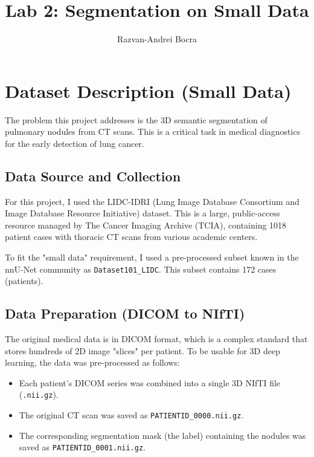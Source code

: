 \documentclass[11pt, a4paper]{article}
\title{Lab 2: Segmentation on Small Data}
\author{Razvan-Andrei Bocra}
\begin{document}
\maketitle

\section{Dataset Description (Small Data)}

The problem this project addresses is the 3D semantic segmentation of pulmonary nodules from CT scans. This is a critical task in medical diagnostics for the early detection of lung cancer.

\subsection{Data Source and Collection}

For this project, I used the LIDC-IDRI (Lung Image Database Consortium and Image Database Resource Initiative) dataset. This is a large, public-access resource managed by The Cancer Imaging Archive (TCIA), containing 1018 patient cases with thoracic CT scans from various academic centers.

To fit the "small data" requirement, I used a pre-processed subset known in the nnU-Net community as \texttt{Dataset101\_LIDC}. This subset contains 172 cases (patients).

\subsection{Data Preparation (DICOM to NIfTI)}

The original medical data is in DICOM format, which is a complex standard that stores hundreds of 2D image "slices" per patient. To be usable for 3D deep learning, the data was pre-processed as follows:

\begin{itemize}
    \item Each patient's DICOM series was combined into a single 3D NIfTI file (\texttt{.nii.gz}). %
    \item The original CT scan was saved as \texttt{PATIENTID\_0000.nii.gz}. %
    \item The corresponding segmentation mask (the label) containing the nodules was saved as \texttt{PATIENTID\_0001.nii.gz}. %
\end{itemize}
\end{document}
